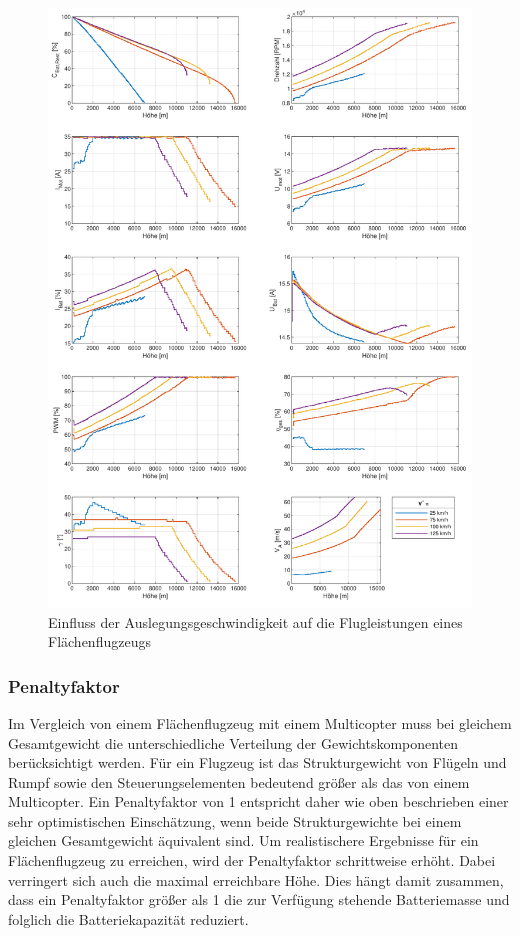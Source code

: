 \begin{figure}[H]
\centering
	\includegraphics[scale=0.8]{Diagramme/Flaechenflzg_Vstern.pdf}
	\caption{Einfluss der Auslegungsgeschwindigkeit auf die Flugleistungen eines Flächenflugzeugs}
	\label{abb:vstern}
\end{figure}



\subsubsection{Penaltyfaktor}
Im Vergleich von einem Flächenflugzeug mit einem Multicopter muss bei gleichem Gesamtgewicht die unterschiedliche Verteilung der Gewichtskomponenten berücksichtigt werden. Für ein Flugzeug ist das Strukturgewicht von Flügeln und Rumpf sowie den Steuerungselementen bedeutend größer als das von einem Multicopter. Ein Penaltyfaktor von 1 entspricht daher wie oben beschrieben einer sehr optimistischen Einschätzung, wenn beide Strukturgewichte bei einem gleichen Gesamtgewicht äquivalent sind. Um realistischere Ergebnisse für ein Flächenflugzeug zu erreichen, wird der Penaltyfaktor schrittweise erhöht. Dabei verringert sich auch die maximal erreichbare Höhe. Dies hängt damit zusammen, dass ein Penaltyfaktor größer als 1 die zur Verfügung stehende Batteriemasse und folglich die Batteriekapazität reduziert.

